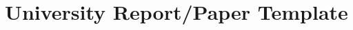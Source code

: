 %
%
%
% 
%
%

\title{University Report/Paper Template}

\documentclass[12pt]{article}
\usepackage[english]{babel}
\usepackage[utf8x]{inputenc}
\usepackage{amsmath}
\usepackage{graphicx}
\usepackage[colorinlistoftodos]{todonotes}



